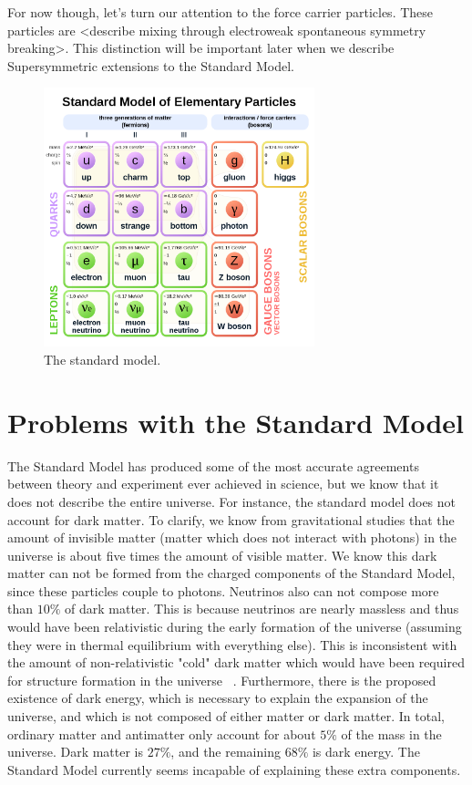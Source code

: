 For now though, let's turn our attention to the force carrier particles. These particles are <describe mixing through electroweak spontaneous symmetry breaking>. This distinction will be important later when we describe Supersymmetric extensions to the Standard Model.

\begin{figure}[htbp]
    \centering
    \includegraphics[width=0.7\textwidth]{Images/standard_model.png}
    \caption{The standard model.}
    \label{fig:standard_model}
\end{figure}

\section{Problems with the Standard Model}

The Standard Model has produced some of the most accurate agreements between theory and experiment ever achieved in science, but we know that it does not describe the entire universe. For instance, the standard model does not account for dark matter. To clarify, we know from gravitational studies that the amount of invisible matter (matter which does not interact with photons) in the universe is about five times the amount of visible matter. We know this dark matter can not be formed from the charged components of the Standard Model, since these particles couple to photons. Neutrinos also can not compose more than $10\%$ of dark matter. This is because neutrinos are nearly massless and thus would have been relativistic during the early formation of the universe (assuming they were in thermal equilibrium with everything else). This is inconsistent with the amount of non-relativistic "cold" dark matter which would have been required for structure formation in the universe ~\cite{structure_formation}. Furthermore, there is the proposed existence of dark energy, which is necessary to explain the expansion of the universe, and which is not composed of either matter or dark matter. In total, ordinary matter and antimatter only account for about $5\%$ of the mass in the universe. Dark matter is $27\%$, and the remaining $68\%$ is dark energy. The Standard Model currently seems incapable of explaining these extra components.


